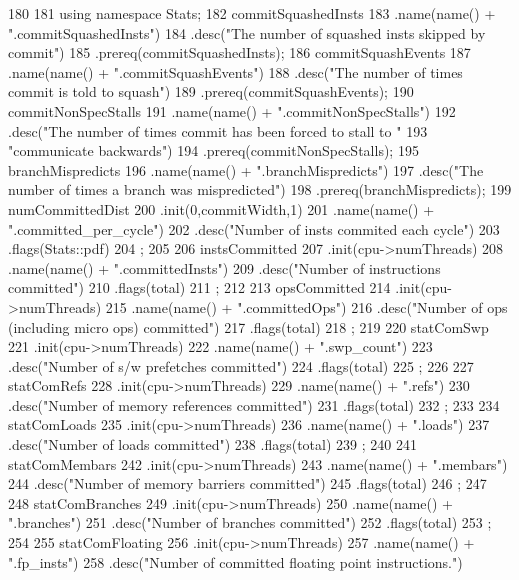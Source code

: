 \begin{DoxyCode}
180 {
181     using namespace Stats;
182     commitSquashedInsts
183         .name(name() + ".commitSquashedInsts")
184         .desc("The number of squashed insts skipped by commit")
185         .prereq(commitSquashedInsts);
186     commitSquashEvents
187         .name(name() + ".commitSquashEvents")
188         .desc("The number of times commit is told to squash")
189         .prereq(commitSquashEvents);
190     commitNonSpecStalls
191         .name(name() + ".commitNonSpecStalls")
192         .desc("The number of times commit has been forced to stall to "
193               "communicate backwards")
194         .prereq(commitNonSpecStalls);
195     branchMispredicts
196         .name(name() + ".branchMispredicts")
197         .desc("The number of times a branch was mispredicted")
198         .prereq(branchMispredicts);
199     numCommittedDist
200         .init(0,commitWidth,1)
201         .name(name() + ".committed_per_cycle")
202         .desc("Number of insts commited each cycle")
203         .flags(Stats::pdf)
204         ;
205 
206     instsCommitted
207         .init(cpu->numThreads)
208         .name(name() + ".committedInsts")
209         .desc("Number of instructions committed")
210         .flags(total)
211         ;
212 
213     opsCommitted
214         .init(cpu->numThreads)
215         .name(name() + ".committedOps")
216         .desc("Number of ops (including micro ops) committed")
217         .flags(total)
218         ;
219 
220     statComSwp
221         .init(cpu->numThreads)
222         .name(name() + ".swp_count")
223         .desc("Number of s/w prefetches committed")
224         .flags(total)
225         ;
226 
227     statComRefs
228         .init(cpu->numThreads)
229         .name(name() +  ".refs")
230         .desc("Number of memory references committed")
231         .flags(total)
232         ;
233 
234     statComLoads
235         .init(cpu->numThreads)
236         .name(name() +  ".loads")
237         .desc("Number of loads committed")
238         .flags(total)
239         ;
240 
241     statComMembars
242         .init(cpu->numThreads)
243         .name(name() +  ".membars")
244         .desc("Number of memory barriers committed")
245         .flags(total)
246         ;
247 
248     statComBranches
249         .init(cpu->numThreads)
250         .name(name() + ".branches")
251         .desc("Number of branches committed")
252         .flags(total)
253         ;
254 
255     statComFloating
256         .init(cpu->numThreads)
257         .name(name() + ".fp_insts")
258         .desc("Number of committed floating point instructions.")
}
\end{DoxyCode}
